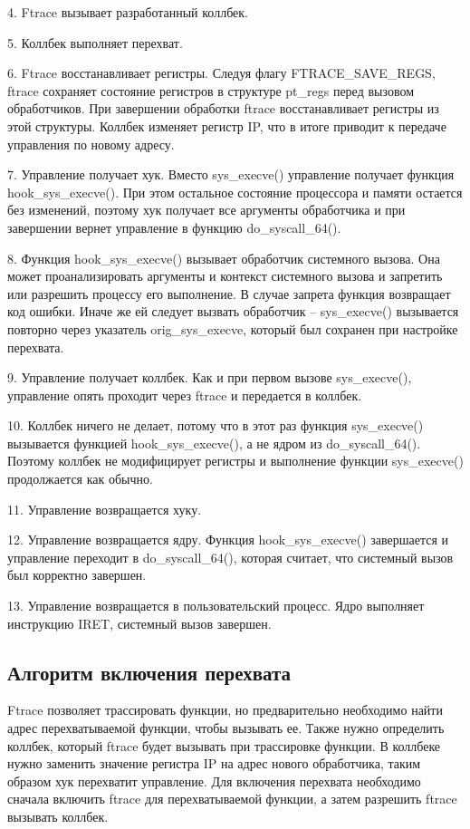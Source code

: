 4. Ftrace вызывает разработанный коллбек.

5. Коллбек выполняет перехват.

6. Ftrace восстанавливает регистры. Следуя флагу FTRACE\_SAVE\_REGS, ftrace сохраняет состояние регистров в структуре pt\_regs перед вызовом обработчиков. При завершении обработки ftrace восстанавливает регистры из этой структуры. Коллбек изменяет регистр IP, что в итоге приводит к передаче управления по новому адресу.

7. Управление получает хук. Вместо sys\_execve() управление получает функция hook\_sys\_execve(). При этом остальное состояние процессора и памяти остается без изменений, поэтому хук получает все аргументы обработчика и при завершении вернет управление в функцию do\_syscall\_64().

8. Функция hook\_sys\_execve() вызывает обработчик системного вызова. Она может проанализировать аргументы и контекст системного вызова и запретить или разрешить процессу его выполнение. В случае запрета функция возвращает код ошибки. Иначе же ей следует вызвать обработчик -- sys\_execve() вызывается повторно через указатель orig\_sys\_execve, который был сохранен при настройке перехвата.

9. Управление получает коллбек. Как и при первом вызове sys\_execve(), управление опять проходит через ftrace и передается в коллбек.
 
10. Коллбек ничего не делает, потому что в этот раз функция sys\_execve() вызывается функцией hook\_sys\_execve(), а не ядром из do\_syscall\_64(). Поэтому коллбек не модифицирует регистры и выполнение функции sys\_execve() продолжается как обычно.
 
11. Управление возвращается хуку.

12. Управление возвращается ядру. Функция hook\_sys\_execve() завершается и управление переходит в do\_syscall\_64(), которая считает, что системный вызов был корректно завершен.

13. Управление возвращается в пользовательский процесс. Ядро выполняет инструкцию IRET, системный вызов завершен.

\subsection{Алгоритм включения перехвата}

Ftrace позволяет трассировать функции, но предварительно необходимо найти адрес перехватываемой функции, чтобы вызывать ее.
Также нужно определить коллбек, который ftrace будет вызывать при трассировке функции. В коллбеке нужно заменить значение регистра IP на адрес нового обработчика, таким образом хук перехватит управление.
Для включения перехвата необходимо сначала включить ftrace для перехватываемой функции, а затем разрешить ftrace вызывать коллбек.

